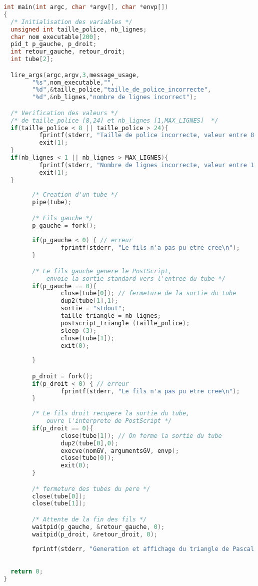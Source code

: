 \begin{lstlisting}[language=C, label={lst:tubeq5}, caption={Utilisation d'un tube dans la fonction main.}]
int main(int argc, char *argv[], char *envp[])
{
  /* Initialisation des variables */
  unsigned int taille_police, nb_lignes;
  char nom_executable[200];
  pid_t p_gauche, p_droit;
  int retour_gauche, retour_droit;
  int tube[2];

  lire_args(argc,argv,3,message_usage, 
        "%s",nom_executable,"",
        "%d",&taille_police,"taille_de_police_incorrecte",
        "%d",&nb_lignes,"nombre de lignes incorrect");

  /* Verification des valeurs */
  /* de taille_police [8,24] et nb_lignes [1,MAX_LIGNES]  */
  if(taille_police < 8 || taille_police > 24){
          fprintf(stderr, "Taille de police incorrecte, valeur entre 8 et 24 attendue\n");
          exit(1);
  }
  if(nb_lignes < 1 || nb_lignes > MAX_LIGNES){
          fprintf(stderr, "Nombre de lignes incorrecte, valeur entre 1 et %d attendue\n", MAX_LIGNES);
          exit(1);
  }
    
        /* Creation d'un tube */
        pipe(tube);

        /* Fils gauche */
        p_gauche = fork();
        
        if(p_gauche < 0) { // erreur
                fprintf(stderr, "Le fils n'a pas pu etre cree\n");
        }

		/* Le fils gauche genere le PostScript,
			envoie la sortie standard vers l'entree du tube */
        if(p_gauche == 0){
                close(tube[0]); // fermeture de la sortie du tube
                dup2(tube[1],1);
                sortie = "stdout";
                taille_triangle = nb_lignes;
                postscript_triangle (taille_police);
                sleep (3);
                close(tube[1]);
                exit(0);
                
        }

		p_droit = fork();
        if(p_droit < 0) { // erreur
                fprintf(stderr, "Le fils n'a pas pu etre cree\n");
        }
		
		/* Le fils droit recupere la sortie du tube,
			ouvre l'interprete de PostScript */
        if(p_droit == 0){
                close(tube[1]); // On ferme la sortie du tube
                dup2(tube[0],0);
                execve(nomGV, argumentsGV, envp);
                close(tube[0]);
                exit(0);
        }

        /* fermeture des tubes du pere */    
        close(tube[0]);
        close(tube[1]);

        /* Attente de la fin des fils */
        waitpid(p_gauche, &retour_gauche, 0);
        waitpid(p_droit, &retour_droit, 0);
        
        fprintf(stderr, "Generation et affichage du triangle de Pascal termine\n");
        
        
  return 0;
}
\end{lstlisting}
